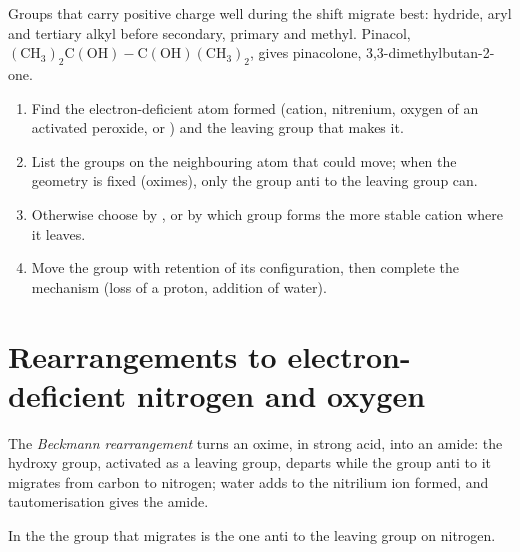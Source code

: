 Groups that carry positive charge well during the shift migrate best: hydride,
aryl and tertiary alkyl before secondary, primary and methyl. Pinacol,
$\mathrm{(CH_3)_2C(OH){-}C(OH)(CH_3)_2}$, gives pinacolone, 3,3-dimethylbutan-2-one.

\begin{method}\label{met:b3:radicals-carbenes:rearrangement}
\begin{enumerate}
  \item Find the electron-deficient atom formed (cation, nitrenium, oxygen of an
        activated peroxide,  or ) and the leaving group that makes
        it.
  \item List the groups on the neighbouring atom that could move; when the
        geometry is fixed (oximes), only the group anti to the leaving group can.
  \item Otherwise choose by , or by which group forms the more
        stable cation where it leaves.
  \item Move the group with retention of its configuration, then complete the
        mechanism (loss of a proton, addition of water).
\end{enumerate}
\end{method}

\section{Rearrangements to electron-deficient nitrogen and oxygen}

\begin{definition}\label{def:b3:radicals-carbenes:beckmann}
The \emph{Beckmann rearrangement} turns an oxime,
in strong acid, into an amide: the hydroxy group, activated as a leaving group,
departs while the group anti to it migrates from carbon to nitrogen; water adds
to the nitrilium ion formed, and tautomerisation gives the amide.
\end{definition}

\begin{proposition}\label{prop:b3:radicals-carbenes:beckmann-anti}
In the  the group that migrates is the one anti to the
leaving group on nitrogen.
\end{proposition}


